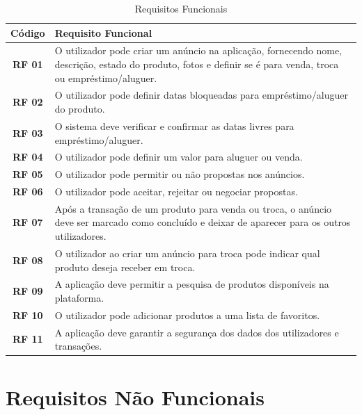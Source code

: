\documentclass[a4paper, 12pt]{article} %
\begin{document}
\begin{table}[H]
	\centering
	\renewcommand{\arraystretch}{1.3}
	\begin{tabular}{|c|p{12cm}|}
		\hline
		\textbf{Código} & \textbf{Requisito Funcional} \\
		\hline
		\textbf{RF 01} & O utilizador pode criar um anúncio na aplicação, fornecendo nome, descrição, estado do produto, fotos e definir se é para venda, troca ou empréstimo/aluguer. \\
		\hline
		\textbf{RF 02} & O utilizador pode definir datas bloqueadas para empréstimo/aluguer do produto. \\
		\hline
		\textbf{RF 03} & O sistema deve verificar e confirmar as datas livres para empréstimo/aluguer. \\
		\hline
		\textbf{RF 04} & O utilizador pode definir um valor para aluguer ou venda. \\
		\hline
		\textbf{RF 05} & O utilizador pode permitir ou não propostas nos anúncios. \\
		\hline
		\textbf{RF 06} & O utilizador pode aceitar, rejeitar ou negociar propostas. \\
		\hline
		\textbf{RF 07} & Após a transação de um produto para venda ou troca, o anúncio deve ser marcado como concluído e deixar de aparecer para os outros utilizadores. \\
		\hline
		\textbf{RF 08} & O utilizador ao criar um anúncio para troca pode indicar qual produto deseja receber em troca. \\
		\hline
		\textbf{RF 09} & A aplicação deve permitir a pesquisa de produtos disponíveis na plataforma. \\
		\hline
		\textbf{RF 10} & O utilizador pode adicionar produtos a uma lista de favoritos. \\
		\hline
		\textbf{RF 11} & A aplicação deve garantir a segurança dos dados dos utilizadores e transações. \\
		\hline
	\end{tabular}
	\caption{Requisitos Funcionais}
	\label{tab:requisitos_funcionais}
\end{table}


\newpage
\section{Requisitos Não Funcionais}
\end{document}

